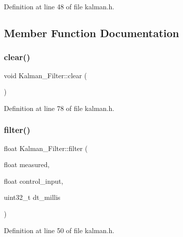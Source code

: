 Definition at line 48 of file kalman.\+h.



\subsection{Member Function Documentation}
\mbox{\label{class_kalman___filter_a530ce9a34bda5562f01e782d4e4d5ebb}} 
\subsubsection{\texorpdfstring{clear()}{clear()}}
{\footnotesize\ttfamily void Kalman\+\_\+\+Filter\+::clear (\begin{DoxyParamCaption}{ }\end{DoxyParamCaption})\hspace{0.3cm}{\ttfamily [inline]}}



Definition at line 78 of file kalman.\+h.

\mbox{\label{class_kalman___filter_a6ee45f2d0368a57b7ea49185a52d8175}} 
\subsubsection{\texorpdfstring{filter()}{filter()}}
{\footnotesize\ttfamily float Kalman\+\_\+\+Filter\+::filter (\begin{DoxyParamCaption}\item[{float}]{measured,  }\item[{float}]{control\+\_\+input,  }\item[{uint32\+\_\+t}]{dt\+\_\+millis }\end{DoxyParamCaption})\hspace{0.3cm}{\ttfamily [inline]}}



Definition at line 50 of file kalman.\+h.

